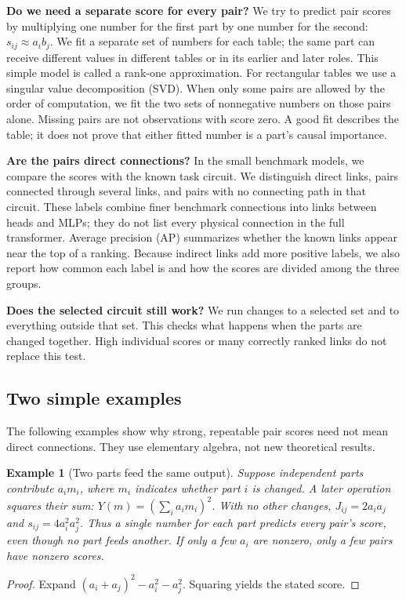 \documentclass[11pt]{article}
\newtheorem{proposition}{Example}
\begin{document}
\textbf{Do we need a separate score for every pair?} We try to predict pair
scores by multiplying one number for the first part by one number for the
second: $s_{ij}\approx a_i b_j$. We fit a separate set of numbers for each table;
the same part can receive different values in different tables or in its
earlier and later roles. This simple model is called a rank-one approximation.
For rectangular tables we use a singular value decomposition
(SVD). When only some pairs are allowed by the order of computation, we fit
the two sets of nonnegative numbers on those pairs alone. Missing pairs are
not observations with score zero. A good fit describes the table; it does not
prove that either fitted number is a part's causal importance.

\textbf{Are the pairs direct connections?} In the small benchmark models, we
compare the scores with the known task circuit. We distinguish direct links,
pairs connected through several links, and pairs with no connecting path in
that circuit. These labels combine finer benchmark connections into links
between heads and MLPs; they do not list every physical connection in the full
transformer. Average precision (AP) summarizes whether the known links appear
near the top of a ranking. Because indirect links add more positive labels,
we also report how common each label is and how the scores are divided among
the three groups.

\textbf{Does the selected circuit still work?} We run changes to a selected set
and to everything outside that set. This checks what happens when the parts
are changed together. High individual scores or many correctly ranked links
do not replace this test.

\subsection{Two simple examples}
The following examples show why strong, repeatable pair scores need not mean
direct connections. They use elementary algebra, not new theoretical results.

\begin{proposition}[Two parts feed the same output]
Suppose independent parts contribute $a_i m_i$, where $m_i$ indicates whether
part $i$ is changed. A later operation squares their sum:
$Y(m)=(\sum_i a_i m_i)^2$. With no other changes,
$J_{ij}=2a_i a_j$ and $s_{ij}=4a_i^2a_j^2$. Thus a single number for each part
predicts every pair's score, even though no part feeds another. If only a few
$a_i$ are nonzero, only a few pairs have nonzero scores.
\end{proposition}
\begin{proof}
Expand $(a_i+a_j)^2-a_i^2-a_j^2$. Squaring yields the stated score.
\end{proof}
\end{document}
